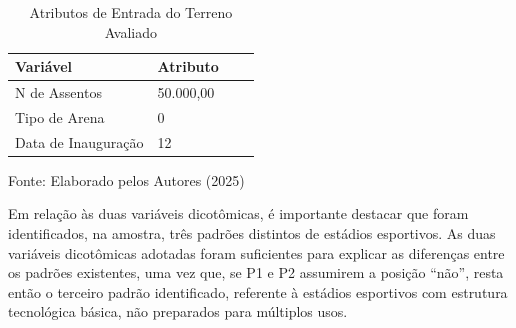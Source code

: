 %
\begin{table}[h!t]
	\centering
	\begin{threeparttable}
		\caption{Atributos de Entrada do Terreno Avaliado }
		\label{Tabela-variaveis}
		\begin{tabular}{p{13cm}lp{5cm} l}
			\toprule
			Variável & Atributo    	 \\\midrule
			N de Assentos	& 50.000,00 	 \\	 
			Tipo de Arena	& 0 \\	 
			Data de Inauguração	&12      \\\bottomrule
		\end{tabular}%
		\begin{tablenotes}
			\item [{\normalsize Fonte:     Elaborado pelos Autores (2025)}]  
		\end{tablenotes}
	\end{threeparttable}
\end{table}
\hspace*{1.25 cm} Em relação às duas variáveis dicotômicas, é importante destacar que foram identificados, na amostra, três padrões distintos de estádios esportivos. As duas variáveis dicotômicas adotadas foram suficientes para explicar as diferenças entre os padrões existentes, uma vez que, se P1 e P2 assumirem a posição “não”, resta então o terceiro padrão identificado, referente à estádios esportivos com estrutura tecnológica básica, não preparados para múltiplos usos.
%
%

